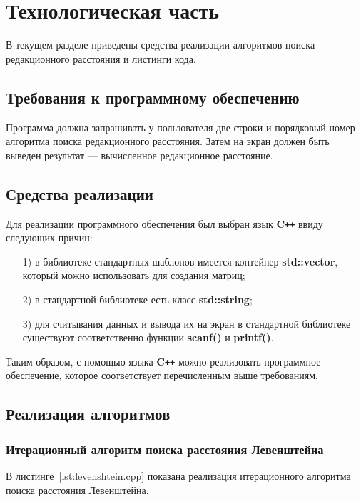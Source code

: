 \chapter{Технологическая часть}

В текущем разделе приведены средства реализации алгоритмов поиска редакционного расстояния и листинги кода.

\section{Требования к программному обеспечению}

Программа должна запрашивать у пользователя две строки и порядковый номер алгоритма поиска редакционного расстояния. 
Затем на экран должен быть выведен результат --- вычисленное редакционное расстояние.
 
\section{Средства реализации}

Для реализации программного обеспечения был выбран язык \textbf{C\texttt{++}} ввиду следующих причин:

\begin{enumerate}
\item[1)]
в библиотеке стандартных шаблонов имеется контейнер \textbf{std::vector}, который можно использовать для создания матриц;
\item[2)]
в стандартной библиотеке есть класс \textbf{std::string};
\item[3)]
для считывания данных и вывода их на экран в стандартной библиотеке существуют соответственно функции \textbf{scanf()} и \textbf{printf()}.
\end{enumerate}

Таким образом, с помощью языка \textbf{C\texttt{++}} можно реализовать программное обеспечение, которое соответствует перечисленным выше требованиям.

\pagebreak
\section{Реализация алгоритмов}

\subsection{Итерационный алгоритм поиска расстояния Левенштейна}

В листинге~\ref{lst:levenshtein.cpp} показана реализация итерационного алгоритма поиска расстояния Левенштейна.

